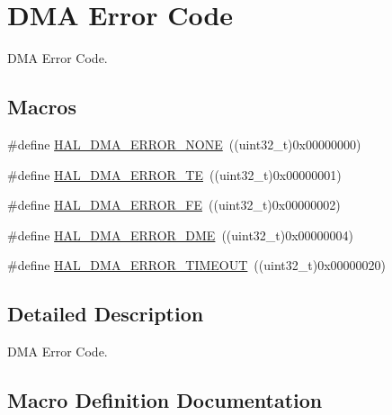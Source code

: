 \hypertarget{group___d_m_a___error___code}{}\section{D\+MA Error Code}
\label{group___d_m_a___error___code}


D\+MA Error Code.  


\subsection*{Macros}
\begin{DoxyCompactItemize}
\item 
\#define \hyperlink{group___d_m_a___error___code_gaad4009390bfbe05a1bb7115d03c25a97}{H\+A\+L\+\_\+\+D\+M\+A\+\_\+\+E\+R\+R\+O\+R\+\_\+\+N\+O\+NE}~((uint32\+\_\+t)0x00000000)
\item 
\#define \hyperlink{group___d_m_a___error___code_ga9882442c5f8f0170917934bbee1cc92d}{H\+A\+L\+\_\+\+D\+M\+A\+\_\+\+E\+R\+R\+O\+R\+\_\+\+TE}~((uint32\+\_\+t)0x00000001)
\item 
\#define \hyperlink{group___d_m_a___error___code_ga019411712b9aee1d34b57d029a461fa4}{H\+A\+L\+\_\+\+D\+M\+A\+\_\+\+E\+R\+R\+O\+R\+\_\+\+FE}~((uint32\+\_\+t)0x00000002)
\item 
\#define \hyperlink{group___d_m_a___error___code_gabac48184446aea8f467483382fc6689b}{H\+A\+L\+\_\+\+D\+M\+A\+\_\+\+E\+R\+R\+O\+R\+\_\+\+D\+ME}~((uint32\+\_\+t)0x00000004)
\item 
\#define \hyperlink{group___d_m_a___error___code_ga6cf6a5b8881ff36ed4316a29bbfb5b79}{H\+A\+L\+\_\+\+D\+M\+A\+\_\+\+E\+R\+R\+O\+R\+\_\+\+T\+I\+M\+E\+O\+UT}~((uint32\+\_\+t)0x00000020)
\end{DoxyCompactItemize}


\subsection{Detailed Description}
D\+MA Error Code. 



\subsection{Macro Definition Documentation}
